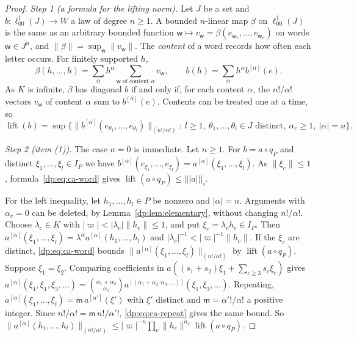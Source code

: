 \documentclass[11pt]{amsart}
\theoremstyle{definition}
\theoremstyle{remark}
\numberwithin{equation}{section}
\newcommand{\abs}[1]{\lvert #1\rvert}
\newcommand{\norm}[1]{\lVert #1\rVert}
\theoremstyle{plain}
\theoremstyle{definition}
\theoremstyle{plain}
\begin{document}
\begin{proof}
\emph{Step 1 (a formula for the lifting norm).} Let $J$ be a set and $b\colon\ell^1_{00}(J)\to W$ a law of degree $n\ge1$. A bounded $n$-linear map $\beta$ on $\ell^1_{00}(J)$ is the same as an arbitrary bounded function $\mathsf w\mapsto v_{\mathsf w}=\beta(e_{\mathsf w_1},\dots,e_{\mathsf w_n})$ on words $\mathsf w\in J^n$, and $\norm\beta=\sup_{\mathsf w}\norm{v_{\mathsf w}}$. The \emph{content} of a word records how often each letter occurs. For finitely supported $h$,
\[
 \beta(h,\dots,h)=\sum_\alpha h^\alpha\sum_{\mathsf w\text{ of content }\alpha}v_{\mathsf w},\qquad b(h)=\sum_\alpha h^\alpha b^{[\alpha]}(e).
\]
As $K$ is infinite, $\beta$ has diagonal $b$ if and only if, for each content $\alpha$, the $n!/\alpha!$ vectors $v_{\mathsf w}$ of content $\alpha$ sum to $b^{[\alpha]}(e)$. Contents can be treated one at a time, so
\begin{equation}\label{dp:eq:ca-word}
 \operatorname{lift}(b)=\sup\bigl\{\norm{b^{[\alpha]}(e_{\theta_1},\dots,e_{\theta_l})}_{(n!/\alpha!)}:\ l\ge1,\ \theta_1,\dots,\theta_l\in J\text{ distinct},\ \alpha_c\ge1,\ \abs\alpha=n\bigr\}.
\end{equation}

\emph{Step 2 (item (1)).} The case $n=0$ is immediate. Let $n\ge1$. For $b=a\circ q_P$ and distinct $\xi_1,\dots,\xi_l\in I_P$ we have $b^{[\alpha]}(e_{\xi_1},\dots,e_{\xi_l})=a^{[\alpha]}(\xi_1,\dots,\xi_l)$. As $\norm{\xi_c}\le1$, formula~\eqref{dp:eq:ca-word} gives $\operatorname{lift}(a\circ q_P)\le\lvert\!\lvert\!\lvert a\rvert\!\rvert\!\rvert_\flat$.

For the left inequality, let $h_1,\dots,h_l\in P$ be nonzero and $\abs\alpha=n$. Arguments with $\alpha_c=0$ can be deleted, by Lemma~\ref{dp:lem:elementary}, without changing $n!/\alpha!$. Choose $\lambda_c\in K$ with $\abs\varpi<\abs{\lambda_c}\norm{h_c}\le1$, and put $\xi_c=\lambda_ch_c\in I_P$. Then $a^{[\alpha]}(\xi_1,\dots,\xi_l)=\lambda^\alpha a^{[\alpha]}(h_1,\dots,h_l)$ and $\abs{\lambda_c}^{-1}<\abs\varpi^{-1}\norm{h_c}$. If the $\xi_c$ are distinct, \eqref{dp:eq:ca-word} bounds $\norm{a^{[\alpha]}(\xi_1,\dots,\xi_l)}_{(n!/\alpha!)}$ by $\operatorname{lift}(a\circ q_P)$. Suppose $\xi_1=\xi_2$. Comparing coefficients in $a((s_1+s_2)\xi_1+\sum_{c\ge3}s_c\xi_c)$ gives $a^{[\alpha]}(\xi_1,\xi_1,\xi_3,\dots)=\binom{\alpha_1+\alpha_2}{\alpha_1}a^{[(\alpha_1+\alpha_2,\alpha_3,\dots)]}(\xi_1,\xi_3,\dots)$. Repeating, $a^{[\alpha]}(\xi_1,\dots,\xi_l)=\mathsf m\,a^{[\alpha']}(\xi')$ with $\xi'$ distinct and $\mathsf m=\alpha'!/\alpha!$ a positive integer. Since $n!/\alpha!=\mathsf m\,n!/\alpha'!$, \eqref{dp:eq:ca-repeat} gives the same bound. So $\norm{a^{[\alpha]}(h_1,\dots,h_l)}_{(n!/\alpha!)}\le\abs\varpi^{-n}\prod_c\norm{h_c}^{\alpha_c}\operatorname{lift}(a\circ q_P)$.


\end{proof}
\end{document}
